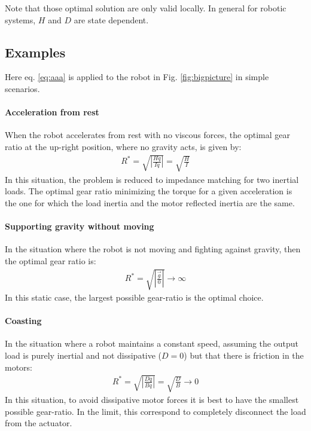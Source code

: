 Note that those optimal solution are only valid locally. In general for robotic systems, $H$ and $D$ are state dependent. 


\subsection{Examples}
\label{sec:Examples}

Here eq. \eqref{eq:aaa} is applied to the robot in Fig. \ref{fig:bigpicture} in simple scenarios. 

\paragraph{Acceleration from rest} 

When the robot accelerates from rest with no viscous forces, the optimal gear ratio at the up-right position, where no gravity acts, is given by:
\begin{align}
	R^{*}  = \sqrt{ \left | \frac{H \ddot{q} }{ I \ddot{q} } \right |   } = \sqrt{ \frac{H}{I}}
 \label{eq:impmatching}
\end{align}
In this situation, the problem is reduced to impedance matching for two inertial loads. The optimal gear ratio minimizing the torque for a given acceleration is the one for which the load inertia and the motor reflected inertia are the same.

\paragraph{Supporting gravity without moving}

In the situation where the robot is not moving and fighting against gravity, then the optimal gear ratio is:
\begin{align}
	R^{*}  = \sqrt{ \left | \frac{ \vec{g} }{ 0 } \right |   } \rightarrow \infty
 \label{eq:gravrejection}
\end{align}
In this static case, the largest possible gear-ratio is the optimal choice. 


\paragraph{Coasting} 

In the situation where a robot maintains a constant speed, assuming the output load is purely inertial and not dissipative ($D=0$) but that there is friction in the motors:
%
\begin{align}
	R^{*}  = \sqrt{ \left | \frac{D \dot{q} }{ B \dot{q} } \right |   } = \sqrt{ \frac{D}{B}} \rightarrow 0
 \label{eq:impmatching}
\end{align}
%
In this situation, to avoid dissipative motor forces it is best to have the smallest possible gear-ratio. In the limit, this correspond to completely disconnect the load from the actuator.

